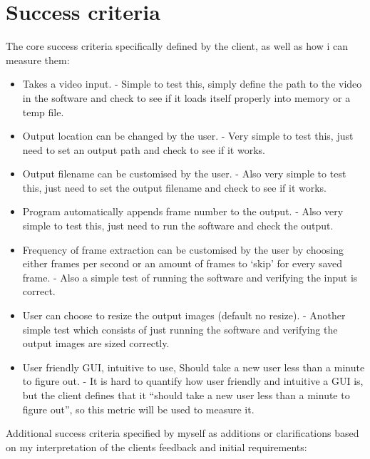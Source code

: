 \documentclass[11pt]{report}
\begin{document}
\section{Success criteria}
The core success criteria specifically defined by the client, as well as how i can measure them:
\begin{itemize}
\item Takes a video input. - Simple to test this, simply define the path to the video in the software and check to see if it loads itself properly into memory or a temp file.
\item Output location can be changed by the user. - Very simple to test this, just need to set an output path and check to see if it works.
\item Output filename can be customised by the user. - Also very simple to test this, just need to set the output filename and check to see if it works.
\item Program automatically appends frame number to the output. - Also very simple to test this, just need to run the software and check the output.
\item Frequency of frame extraction can be customised by the user by choosing either frames per second or an amount of frames to `skip' for every saved frame. - Also a simple test of running the software and verifying the input is correct.
\item User can choose to resize the output images (default no resize). - Another simple test which consists of just running the software and verifying the output images are sized correctly.
\item User friendly GUI, intuitive to use, Should take a new user less than a minute to figure out. - It is hard to quantify how user friendly and intuitive a GUI is, but the client defines that it ``should take a new user less than a minute to figure out'', so this metric will be used to measure it.
\end{itemize}
Additional success criteria specified by myself as additions or clarifications based on my interpretation of the clients feedback and initial requirements:
\end{document}
